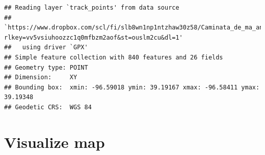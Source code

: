 \documentclass[
]{book}
\newenvironment{Shaded}{\begin{snugshade}}{\end{snugshade}}
\newcommand{\AttributeTok}[1]{\textcolor[rgb]{0.13,0.29,0.53}{#1}}
\newcommand{\CommentTok}[1]{\textcolor[rgb]{0.56,0.35,0.01}{\textit{#1}}}
\newcommand{\ConstantTok}[1]{\textcolor[rgb]{0.56,0.35,0.01}{#1}}
\newcommand{\DecValTok}[1]{\textcolor[rgb]{0.00,0.00,0.81}{#1}}
\newcommand{\FloatTok}[1]{\textcolor[rgb]{0.00,0.00,0.81}{#1}}
\newcommand{\FunctionTok}[1]{\textcolor[rgb]{0.13,0.29,0.53}{\textbf{#1}}}
\newcommand{\NormalTok}[1]{#1}
\newcommand{\OtherTok}[1]{\textcolor[rgb]{0.56,0.35,0.01}{#1}}
\newcommand{\SpecialCharTok}[1]{\textcolor[rgb]{0.81,0.36,0.00}{\textbf{#1}}}
\newcommand{\StringTok}[1]{\textcolor[rgb]{0.31,0.60,0.02}{#1}}
\begin{document}
\begin{verbatim}
## Reading layer `track_points' from data source 
##   `https://www.dropbox.com/scl/fi/slb8wn1np1ntzhaw30z58/Caminata_de_ma_ana.gpx?rlkey=vv5vsiuhoozzc1q0mfbzm2aof&st=ouslm2cu&dl=1' 
##   using driver `GPX'
## Simple feature collection with 840 features and 26 fields
## Geometry type: POINT
## Dimension:     XY
## Bounding box:  xmin: -96.59018 ymin: 39.19167 xmax: -96.58411 ymax: 39.19348
## Geodetic CRS:  WGS 84
\end{verbatim}

\begin{Shaded}
\end{Shaded}

\hypertarget{visualize-map}{%
\section{Visualize map}\label{visualize-map}}

\begin{Shaded}
\end{Shaded}
\end{document}
